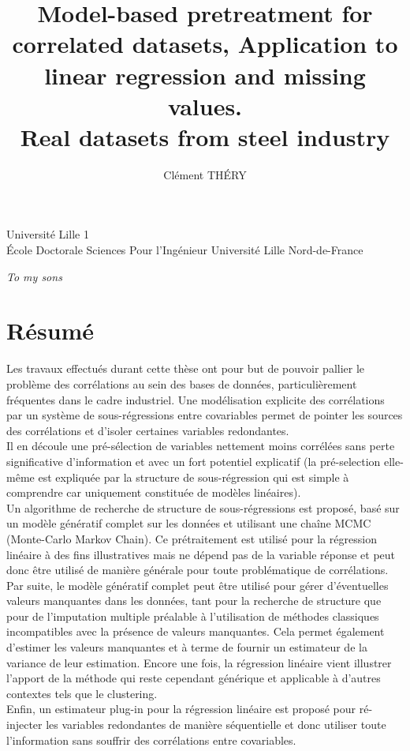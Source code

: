 \documentclass[12pt,a4paper]{report}
\author{Clément TH\'ERY}
\title{Model-based pretreatment for correlated datasets, Application to linear regression and missing values. \\ Real datasets from steel industry}
\begin{document}
	Université Lille 1 \\
	\'Ecole Doctorale Sciences Pour l'Ingénieur Université Lille Nord-de-France
	
\maketitle

\newpage
\itshape To my sons
\upshape


\chapter*{Résumé}
	Les travaux effectués durant cette thèse ont pour but de pouvoir pallier le problème des corrélations au sein des bases de données, particulièrement fréquentes dans le cadre industriel. Une modélisation explicite des corrélations par un système de sous-régressions entre covariables permet de pointer les sources des corrélations et d'isoler certaines variables redondantes. 
	\\
	
	Il en découle une pré-sélection de variables nettement moins corrélées sans perte significative d'information et avec un fort potentiel explicatif (la pré-selection elle-même est expliquée par la structure de sous-régression qui est simple à comprendre car uniquement constituée de modèles linéaires). \\
	
	Un algorithme de recherche de structure de sous-régressions est proposé, basé sur un modèle génératif complet sur les données et utilisant une chaîne MCMC (Monte-Carlo Markov Chain). Ce prétraitement est utilisé pour la régression linéaire à des fins illustratives mais ne dépend pas de la variable réponse et peut donc être utilisé de manière générale pour toute problématique de corrélations.\\
	
	Par suite, le modèle génératif complet peut être utilisé pour gérer d'éventuelles valeurs manquantes dans les données, tant pour la recherche de structure que pour de l'imputation multiple préalable à l'utilisation de méthodes classiques incompatibles avec la présence de valeurs manquantes. Cela permet également d'estimer les valeurs manquantes et à terme  de fournir un estimateur de la variance de leur estimation.
	Encore une fois, la régression linéaire vient illustrer l'apport de la méthode qui reste cependant générique et applicable à d'autres contextes tels que le clustering.
	\\	
	Enfin, un estimateur plug-in pour la régression linéaire est proposé pour ré-injecter les variables redondantes de manière séquentielle et donc utiliser toute l'information sans souffrir des corrélations entre covariables.
	\\
	
\end{document}
